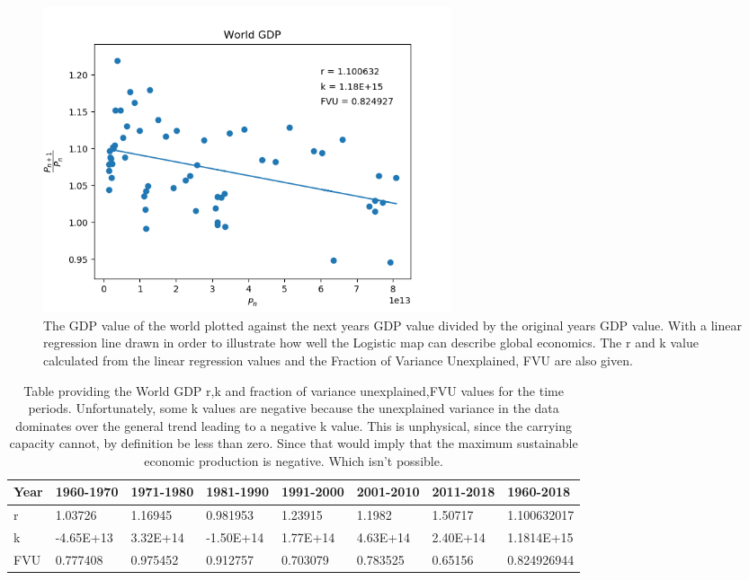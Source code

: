 \documentclass[11pt,a4paper]{CLabBookTemplate} %
\begin{document}
\begin{figure}[h!]
	\centering
	\includegraphics[width = 120mm]{Figures/WorldGDPScatter.png}
	\caption{The GDP value of the world plotted against the next years GDP value divided by the original years GDP value. With a linear regression line drawn in order to illustrate how well the Logistic map can describe global economics. The r and k value calculated from the linear regression values and the Fraction of Variance Unexplained, FVU are also given.}
	\label{fig:WorldGDPScatter}
\end{figure}


\begin{table}[h!]
	\begin{tabular}{|l|l|l|l|l|l|l|l|}
		\hline
		Year & 1960-1970 & 1971-1980 & 1981-1990 & 1991-2000 & 2001-2010 & 2011-2018 & 1960-2018   \\ \hline
		r    & 1.03726   & 1.16945   & 0.981953  & 1.23915   & 1.1982    & 1.50717   & 1.100632017 \\ \hline
		k    & -4.65E+13 & 3.32E+14  & -1.50E+14 & 1.77E+14  & 4.63E+14  & 2.40E+14  & 1.1814E+15  \\ \hline
		FVU  & 0.777408  & 0.975452  & 0.912757  & 0.703079  & 0.783525  & 0.65156   & 0.824926944 \\ \hline
	\end{tabular}
	\caption{Table providing the World GDP r,k and fraction of variance unexplained,FVU values for the time periods. Unfortunately, some k values are negative because the unexplained variance in the data dominates over the general trend leading to a negative k value. This is unphysical, since the carrying capacity cannot, by definition be less than zero. Since that would imply that the maximum sustainable economic production is negative. Which isn't possible. }
	\label{Task1Table}
\end{table}
\end{document}
